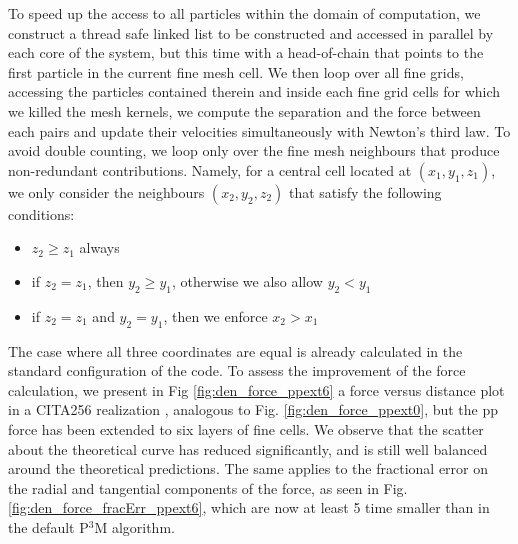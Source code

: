  To speed up the access to all particles within the domain of computation, we construct a thread safe linked list
 to be constructed and accessed in parallel by each core of the system, but this time with a head-of-chain that points to the first particle in the current fine mesh cell. We then loop over all fine grids, accessing the particles contained therein and inside each fine grid cells for which we killed the mesh kernels,
 we compute the separation and the force between each pairs and update their velocities simultaneously with Newton's third law. 
 To avoid double counting, we loop only over the fine mesh neighbours that produce non-redundant contributions. Namely, for a central cell located at 
 $(x_1, y_1, z_1)$, we only consider the neighbours $(x_2, y_2, z_2)$ that satisfy the following conditions:
 \begin{itemize}
 \item{$z_2 \ge z_1$ always}
 \item{if $z_2 = z_1$, then $y_2 \ge y_1$, otherwise we also allow $y_2 < y_1$} 
 \item{if $z_2 = z_1$ and $y_2 = y_1$, then we enforce $x_2 > x_1$}
 \end{itemize}
 The case where all three coordinates are equal is already calculated in the standard configuration of the code.
 To assess the improvement of the force calculation, we present in Fig \ref{fig:den_force_ppext6} a force versus distance
 plot in a CITA256 realization , analogous to Fig. \ref{fig:den_force_ppext0}, but the pp force has been extended to six layers of fine cells. 
 We observe that the scatter about the theoretical curve has reduced significantly, and is still well balanced around the theoretical predictions.
 The same applies to the fractional error on the radial and tangential components of the force, as seen in Fig. \ref{fig:den_force_fracErr_ppext6},
 which are now at least 5 time smaller than in the default P$^{3}$M algorithm.
 

